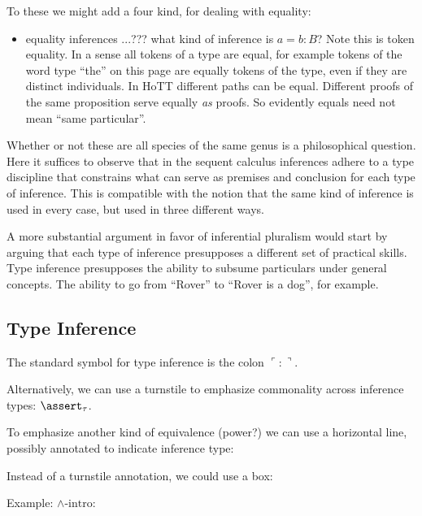 \documentclass{article}
\begin{document}
To these we might add a four kind, for dealing with equality:

\begin{itemize}
\item equality inferences ...??? what kind of inference is \(a=b:B\)?
  Note this is token equality. In a sense all tokens of a type are
  equal, for example tokens of the word type ``the'' on this page are
  equally tokens of the type, even if they are distinct individuals.
  In HoTT different paths can be equal. Different proofs of the same
  proposition serve equally \textit{as} proofs. So evidently equals
  need not mean ``same particular''.
\end{itemize}

Whether or not these are all species of the same genus is a
philosophical question. Here it suffices to observe that in the
sequent calculus inferences adhere to a type discipline that
constrains what can serve as premises and conclusion for each type of
inference. This is compatible with the notion that the same kind of
inference is used in every case, but used in three different ways.

A more substantial argument in favor of inferential pluralism would
start by arguing that each type of inference presupposes a different
set of practical skills. Type inference presupposes the ability to
subsume particulars under general concepts. The ability to go from
``Rover'' to ``Rover is a dog'', for example.

\subsection{Type Inference}

The standard symbol for type inference is the colon \(\ulcorner :\urcorner\).

Alternatively, we can use a turnstile to emphasize commonality across inference types: \(\linfer_{\tau}\).

To emphasize another kind of equivalence (power?) we can use a horizontal line, possibly annotated to indicate inference type:

Instead of a turnstile annotation, we could use a box:

Example: \(\land\text{-intro}\):

\end{document}
